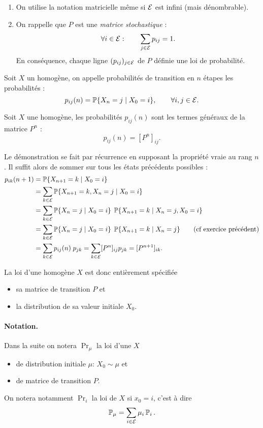 \remark
\begin{enumerate}
  \item On utilise la notation matricielle même si $\mathcal{E}$ est infini (mais dénombrable).
  \item On rappelle que $P$ est une {\em matrice stochastique} : 
  $$
  \forall i \in \mathcal{E}: \qquad \sum_{j \in \mathcal{E}} p_{ij} = 1.
  $$
  En conséquence, chaque ligne $(p_{ij})_{j \in \mathcal{E}}$ de $P$ définie une loi de probabilité.
\end{enumerate}

\begin{definition*}
  Soit $X$ un \cM homogène, on appelle probabilités de transition en $n$ étapes les probabilités :
  $$
  p_{ij}(n) = \operatorname{\mathbb{P}}\{X_n = j \mid X_0 = i\}, \qquad \forall i, j \in \mathcal{E}.  
  $$
\end{definition*}

\begin{proposition*}
  Soit $X$ une \cM homogène, les probabilités $p_{ij}(n)$ sont les termes généraux de la matrice $P^n$ : 
  $$
  p_{ij}(n) = [P^n]_{ij}.
  $$
\end{proposition*}

\proof
Le démonstration se fait par récurrence en supposant la propriété vraie au rang $n$. Il suffit alors de sommer sur tous les états précédents possibles : 
\begin{align*}
  p_{ik}(n+1) 
  & = \operatorname{\mathbb{P}}\{X_{n+1} = k \mid X_0=i\} \\
  & = \sum_{k \in \mathcal{E}} \operatorname{\mathbb{P}}\{X_{n+1} = k, X_n = j \mid X_0=i\} \\
  & = \sum_{k \in \mathcal{E}} \operatorname{\mathbb{P}}\{X_n = j \mid X_0=i\} \; \operatorname{\mathbb{P}}\{X_{n+1} = k \mid X_n = j, X_0=i\} \\
  & = \sum_{k \in \mathcal{E}} \operatorname{\mathbb{P}}\{X_n = j \mid X_0=i\} \; \operatorname{\mathbb{P}}\{X_{n+1} = k \mid X_n = j\} \qquad (\text{cf exercice précédent})\\
  & = \sum_{k \in \mathcal{E}} p_{ij}(n) \; p_{jk} = \sum_{k \in \mathcal{E}} [P^n]_{ij} p_{jk} = [P^{n+1}]_{ik}.
\end{align*}
\eproof

\remark
La loi d'une \cM homogène $X$ est donc entièrement spécifiée 
\begin{itemize}
  \item sa matrice de transition $P$ et
  \item la distribution de sa valeur initiale $X_0$.
\end{itemize}

\paragraph{Notation.}
Dans la suite on notera $\Pr_\mu$ la loi d'une \cM $X$
\begin{itemize}
  \item de distribution initiale $\mu$: $X_0 \sim \mu$ et
  \item de matrice de transition $P$.
\end{itemize}
On notera notamment $\Pr_i$ la loi de $X$ si $x_0 = i$, c'est à dire
$$
\operatorname{\mathbb{P}}_\mu = \sum_{i \in \mathcal{E}} \mu_i \operatorname{\mathbb{P}}_i.
$$

